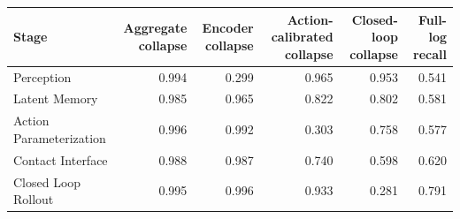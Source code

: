 \begin{tabular}{lrrrrr}
\toprule
Stage & Aggregate collapse & Encoder collapse & Action-calibrated collapse & Closed-loop collapse & Full-log recall \\
\midrule
Perception & 0.994 & 0.299 & 0.965 & 0.953 & 0.541 \\
Latent Memory & 0.985 & 0.965 & 0.822 & 0.802 & 0.581 \\
Action Parameterization & 0.996 & 0.992 & 0.303 & 0.758 & 0.577 \\
Contact Interface & 0.988 & 0.987 & 0.740 & 0.598 & 0.620 \\
Closed Loop Rollout & 0.995 & 0.996 & 0.933 & 0.281 & 0.791 \\
\bottomrule
\end{tabular}
